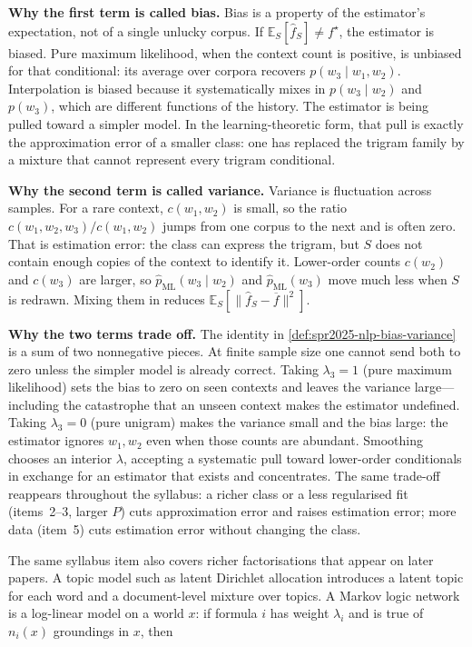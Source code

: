 \documentclass[11pt,a4paper]{article}
\theoremstyle{definition}
\begin{document}
\begin{note}
\medskip\noindent\textbf{Why the first term is called bias.}
Bias is a property of the estimator's expectation, not of a single unlucky corpus. If \(\mathbb{E}_S[\widehat f_S]\neq f^\star\), the estimator is biased. Pure maximum likelihood, when the context count is positive, is unbiased for that conditional: its average over corpora recovers \(p(w_3\mid w_1,w_2)\). Interpolation is biased because it systematically mixes in \(p(w_3\mid w_2)\) and \(p(w_3)\), which are different functions of the history. The estimator is being pulled toward a simpler model. In the learning-theoretic form, that pull is exactly the approximation error of a smaller class: one has replaced the trigram family by a mixture that cannot represent every trigram conditional.

\medskip\noindent\textbf{Why the second term is called variance.}
Variance is fluctuation across samples. For a rare context, \(c(w_1,w_2)\) is small, so the ratio \(c(w_1,w_2,w_3)/c(w_1,w_2)\) jumps from one corpus to the next and is often zero. That is estimation error: the class can express the trigram, but \(S\) does not contain enough copies of the context to identify it. Lower-order counts \(c(w_2)\) and \(c(w_3)\) are larger, so \(\widehat p_{\mathrm{ML}}(w_3\mid w_2)\) and \(\widehat p_{\mathrm{ML}}(w_3)\) move much less when \(S\) is redrawn. Mixing them in reduces \(\mathbb{E}_S[\|\widehat f_S-\overline f\|^2]\).

\medskip\noindent\textbf{Why the two terms trade off.}
The identity in \cref{def:spr2025-nlp-bias-variance} is a sum of two nonnegative pieces. At finite sample size one cannot send both to zero unless the simpler model is already correct. Taking \(\lambda_3=1\) (pure maximum likelihood) sets the bias to zero on seen contexts and leaves the variance large---including the catastrophe that an unseen context makes the estimator undefined. Taking \(\lambda_3=0\) (pure unigram) makes the variance small and the bias large: the estimator ignores \(w_1,w_2\) even when those counts are abundant. Smoothing chooses an interior \(\lambda\), accepting a systematic pull toward lower-order conditionals in exchange for an estimator that exists and concentrates. The same trade-off reappears throughout the syllabus: a richer class or a less regularised fit (items~2--3, larger \(P\)) cuts approximation error and raises estimation error; more data (item~5) cuts estimation error without changing the class.
\end{note}

The same syllabus item also covers richer factorisations that appear on later papers. A topic model such as latent Dirichlet allocation introduces a latent topic for each word and a document-level mixture over topics. A Markov logic network is a log-linear model on a world \(x\): if formula \(i\) has weight \(\lambda_i\) and is true of \(n_i(x)\) groundings in \(x\), then
\end{document}
